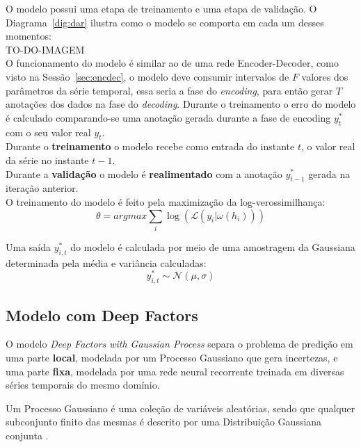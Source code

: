 O modelo possui uma etapa de treinamento e uma etapa de validação. O Diagrama~\ref{dig:dar} ilustra como o modelo se comporta em cada um desses momentos: \\


TO-DO-IMAGEM \\


O funcionamento do modelo é similar ao de uma rede Encoder-Decoder, como visto na Sessão~\ref{sec:encdec}, o modelo deve consumir intervalos de $F$ valores dos parâmetros da série temporal, essa seria a fase do \textit{encoding}, para então gerar $T$ anotações dos dados na fase do \textit{decoding}. Durante o treinamento o erro do modelo é calculado comparando-se uma anotação gerada durante a fase de encoding $y^{*}_{t}$ com o seu valor real $y_{t}$. \\

Durante o \textbf{treinamento} o modelo recebe como entrada do instante $t$, o valor real da série no instante $t-1$. \\
  
Durante a \textbf{validação} o modelo é \textbf{realimentado} com a anotação $y^{*}_{t-1}$ gerada na iteração anterior. \\ 



O treinamento do modelo é feito pela maximização da log-verossimilhança: \\

\[
\theta = argmax \sum_i{\log(\mathcal{L}(y_i | \omega(h_{i})))}
\]


Uma saída $y^*_{i,t}$ do modelo é calculada por meio de uma amostragem da Gaussiana determinada pela média e variância calculadas: \\

\[
 y^*_{i,t} \sim \mathcal{N}(\mu,\sigma) 
\]

\subsection{Modelo com Deep Factors}

O modelo \textit{Deep Factors with Gaussian Process} \cite{deepfactors} separa o problema de predição em uma parte \textbf{local}, modelada por um Processo Gaussiano que gera incertezas, e uma parte \textbf{fixa}, modelada por uma rede neural recorrente treinada em diversas séries temporais do mesmo domínio.


Um Processo Gaussiano é uma coleção de variáveis aleatórias,
sendo que qualquer subconjunto finito das mesmas é descrito por uma Distribuição Gaussiana conjunta \cite{gpml}. \\

